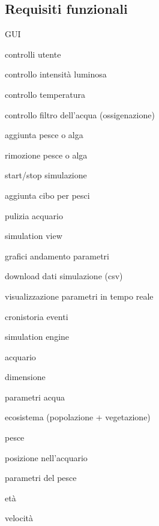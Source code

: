 \documentclass[12pt,a4paper,oneside,article]{article}
\begin{document}
    \subsection{Requisiti funzionali}
    \begin{legal}[label*=3.\arabic*.]
    	\item GUI
    	\begin{legal}
    		\item controlli utente
    		\begin{legal}
    			\item controllo intensità luminosa
    			\item controllo temperatura
    			\item controllo filtro dell'acqua (ossigenazione)
    			\item aggiunta pesce o alga
    			\item rimozione pesce o alga
    			\item start/stop simulazione
    			\item aggiunta cibo per pesci
    			\item pulizia acquario
    		\end{legal}
    		\item simulation view
    		\item grafici andamento parametri
    		\item download dati simulazione (csv)
    		\item visualizzazione parametri in tempo reale
    		\item cronistoria eventi
    	\end{legal}
    	\item simulation engine
    	\begin{legal}
    		\item acquario
    		\begin{legal}
    			\item dimensione
    			\item parametri acqua
    			\item ecosistema (popolazione + vegetazione)
    		\end{legal}
    		\item pesce
    		\begin{legal}
    			\item posizione nell'acquario
    			\item parametri del pesce
    			\begin{legal}
    				\item età
    				\item velocità

\end{legal}
\end{legal}
\end{legal}
\end{legal}
\end{document}
